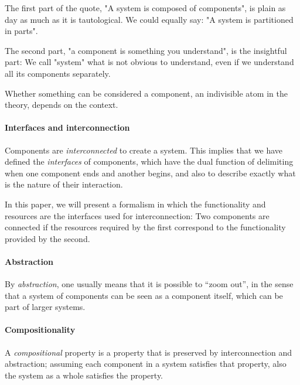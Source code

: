 The first part of the quote, "A system is composed of components", is plain as day as much as
it is tautological. We could equally say: "A system is partitioned in parts".

The second part, "a component is something you understand", is the insightful part: We call
"system" what is not obvious to understand, even if we understand all its components
separately.

Whether something can be considered a component, an indivisible atom in the theory, depends on the context.
%


\paragraph{Interfaces and interconnection}

Components are \emph{interconnected} to create a system.
This implies that we have defined the \emph{interfaces} of components, which
have the dual function of delimiting when one component ends and another begins,
and also to describe exactly what is the nature of their interaction.

In this paper, we will present a formalism in which the functionality and resources
are the interfaces used for interconnection: Two components are connected
if the resources required by the first correspond to the functionality
provided by the second.




\paragraph{Abstraction}

By \emph{abstraction}, one usually means that it is possible to ``zoom out'',
in the sense that a system of components can be seen as a component itself,
which can be part of larger systems.


\paragraph{Compositionality}

A \emph{compositional} property is a property that is preserved by interconnection and abstraction; assuming each component in a system satisfies that property, also the system as a whole satisfies the property.


